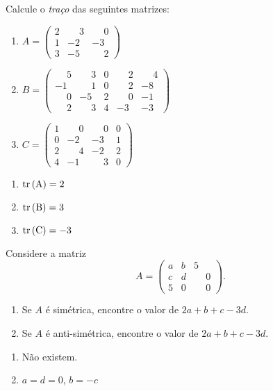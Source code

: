 \documentclass[12pt]{exam}
\begin{document}
\begin{exercicio}
    Calcule o \textit{traço} das seguintes matrizes:
    \begin{enumerate}[label={\alph*})]
        \item $A = \begin{pmatrix}2 & \phantom{-} 3 & \phantom{-} 0\\1 & -2 & -3\\3 & -5 & \phantom{-} 2\end{pmatrix}$
        \item $B = \begin{pmatrix}\phantom{-} 5 & \phantom{-} 3 & 0 & \phantom{-} 2 & \phantom{-} 4\\-1 & \phantom{-} 1 & 0 & \phantom{-} 2 & -8\\\phantom{-} 0 & -5 & 2 & \phantom{-} 0 & -1\\\phantom{-} 2 & \phantom{-} 3 & 4 & -3 & -3\end{pmatrix}$
        \item $C = \begin{pmatrix}1 & \phantom{-} 0 & \phantom{-} 0 & 0\\0 & -2 & -3 & 1\\2 & \phantom{-} 4 & -2 & 2\\4 & -1 & \phantom{-} 3 & 0\end{pmatrix}$
    \end{enumerate}
    \begin{solucao}
        \begin{enumerate}[label={\alph*})]
            \item ${\rm tr\,(A)} = 2$
            \item ${\rm tr\,(B)} = 3$
            \item ${\rm tr\,(C)} = -3$
        \end{enumerate}
    \end{solucao}
\end{exercicio}

\begin{exercicio}
    Considere a matriz
        \[
            A = \begin{pmatrix}a & b & 5\\c & d & \phantom{-} 0\\5 & 0 & \phantom{-} 0\end{pmatrix}.
        \]
        \begin{enumerate}[label={\alph*})]
            \item Se $A$ é simétrica, encontre o valor de $2a + b + c - 3d$.
            \item Se $A$ é anti-simétrica, encontre o valor de $2a + b + c - 3d$.
        \end{enumerate}
        \begin{solucao}
            \begin{enumerate}[label={\alph*})]
                \item Não existem.
                \item $a = d = 0$, $b = -c$ 
            \end{enumerate}
        \end{solucao}
\end{exercicio}
\end{document}
